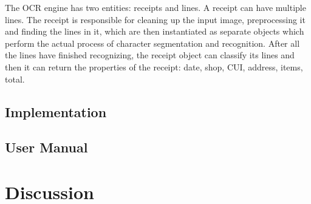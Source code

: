 The OCR engine has two entities: receipts and lines. A receipt can have multiple lines. The receipt is responsible for cleaning up the input image, preprocessing it and finding the lines in it, which are then instantiated as separate objects which perform the actual process of character segmentation and recognition. After all the lines have finished recognizing, the receipt object can classify its lines and then it can return the properties of the receipt: date, shop, CUI, address, items, total. 
\subsection{Implementation}
\subsection{User Manual}
\label{sec:manual}
\section{Discussion}